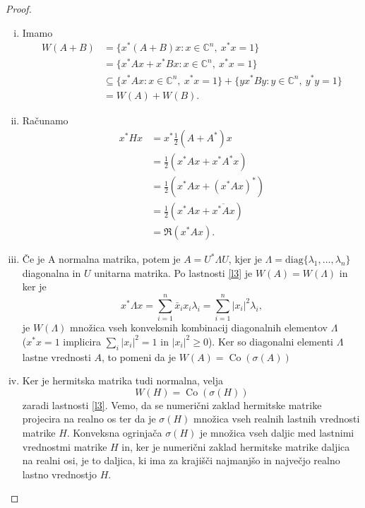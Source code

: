 \documentclass[12pt,a4paper]{amsart}
\theoremstyle{definition}
\theoremstyle{plain}
\newcommand{\Co}{\operatorname{Co}} %
\newcommand{\C}{\mathbb C}
\begin{document}
\begin{proof}
\begin{enumerate}[(i)]
\item Imamo
\begin{align*}
W(A+B)&=\{x^\ast(A+B)x\! : x\in \C^n,\ x^\ast x=1\}\\
& = \{x^\ast Ax +x^\ast Bx\! : x\in \C^n,\ x^\ast x=1\}\\
& \subseteq \{x^\ast Ax\! : x\in \C^n,\ x^\ast x=1\}+\{yx^\ast By\! : y\in \C^n,\ y^\ast y=1\}\\
& =W(A) + W(B).
\end{align*}
\item Računamo
\begin{align*}
x^\ast Hx &= x^\ast \frac{1}{2}(A+A^\ast)x \\
 &=\frac{1}{2} (x^\ast Ax +x^\ast A^\ast x) \\
 &=\frac{1}{2}(x^\ast Ax +(x^\ast Ax)^\ast) \\
 &= \frac{1}{2}(x^\ast Ax +\overline{x^\ast Ax}) \\
 &= \Re (x^\ast Ax).
\end{align*}

\item Če je A normalna matrika, potem je $A=U^\ast \Lambda U$, kjer je $\Lambda = \text{diag}\{\lambda_1, \dots, \lambda_n\}$ diagonalna in $U$ unitarna matrika. 
Po lastnosti \ref{l3} je $W(A)=W(\Lambda)$ in ker je $$x^\ast \Lambda x = \sum_{i=1}^{n} \bar{x}_i x_i\lambda_i = \sum_{i=1}^{n} |x_i|^2 \lambda_i ,$$ 
je $W(\Lambda)$ množica vseh konveksnih kombinacij diagonalnih elementov $\Lambda$\\($x^\ast x=1$ implicira $ \sum_{i} |x_i|^2 =1$ in $|x_i|^2 \geq 0$). 
Ker so diagonalni elementi $\Lambda$ lastne vrednosti $A$, to pomeni da je $W(A) =\Co(\sigma(A))$

\item Ker je hermitska matrika tudi normalna, velja $$W(H) = \Co(\sigma(H))$$ zaradi lastnosti \ref{l3}.
Vemo, da se numerični zaklad hermitske matrike projecira na realno os ter da je $\sigma(H)$ množica vseh realnih lastnih vrednosti matrike $H$. 
Konveksna ogrinjača $\sigma(H)$ je množica vseh daljic med lastnimi vrednostmi matrike $H$ in, ker je numerični zaklad hermitske matrike daljica na realni osi, je to daljica, ki ima za krajišči najmanjšo in največjo realno lastno vrednostjo $H$.
\end{enumerate}
\end{proof}
\end{document}
